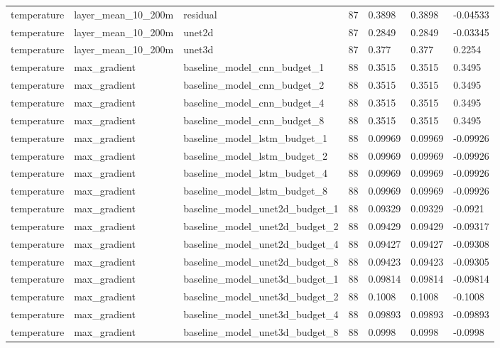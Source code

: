 \begin{table}[htbp]
\begin{tabular}{lllllll}
temperature & layer\_mean\_10\_200m & residual & 87 & 0.3898 & 0.3898 & -0.04533 \\
temperature & layer\_mean\_10\_200m & unet2d & 87 & 0.2849 & 0.2849 & -0.03345 \\
temperature & layer\_mean\_10\_200m & unet3d & 87 & 0.377 & 0.377 & 0.2254 \\
temperature & max\_gradient & baseline\_model\_cnn\_budget\_1 & 88 & 0.3515 & 0.3515 & 0.3495 \\
temperature & max\_gradient & baseline\_model\_cnn\_budget\_2 & 88 & 0.3515 & 0.3515 & 0.3495 \\
temperature & max\_gradient & baseline\_model\_cnn\_budget\_4 & 88 & 0.3515 & 0.3515 & 0.3495 \\
temperature & max\_gradient & baseline\_model\_cnn\_budget\_8 & 88 & 0.3515 & 0.3515 & 0.3495 \\
temperature & max\_gradient & baseline\_model\_lstm\_budget\_1 & 88 & 0.09969 & 0.09969 & -0.09926 \\
temperature & max\_gradient & baseline\_model\_lstm\_budget\_2 & 88 & 0.09969 & 0.09969 & -0.09926 \\
temperature & max\_gradient & baseline\_model\_lstm\_budget\_4 & 88 & 0.09969 & 0.09969 & -0.09926 \\
temperature & max\_gradient & baseline\_model\_lstm\_budget\_8 & 88 & 0.09969 & 0.09969 & -0.09926 \\
temperature & max\_gradient & baseline\_model\_unet2d\_budget\_1 & 88 & 0.09329 & 0.09329 & -0.0921 \\
temperature & max\_gradient & baseline\_model\_unet2d\_budget\_2 & 88 & 0.09429 & 0.09429 & -0.09317 \\
temperature & max\_gradient & baseline\_model\_unet2d\_budget\_4 & 88 & 0.09427 & 0.09427 & -0.09308 \\
temperature & max\_gradient & baseline\_model\_unet2d\_budget\_8 & 88 & 0.09423 & 0.09423 & -0.09305 \\
temperature & max\_gradient & baseline\_model\_unet3d\_budget\_1 & 88 & 0.09814 & 0.09814 & -0.09814 \\
temperature & max\_gradient & baseline\_model\_unet3d\_budget\_2 & 88 & 0.1008 & 0.1008 & -0.1008 \\
temperature & max\_gradient & baseline\_model\_unet3d\_budget\_4 & 88 & 0.09893 & 0.09893 & -0.09893 \\
temperature & max\_gradient & baseline\_model\_unet3d\_budget\_8 & 88 & 0.0998 & 0.0998 & -0.0998 \\

\end{tabular}
\end{table}

